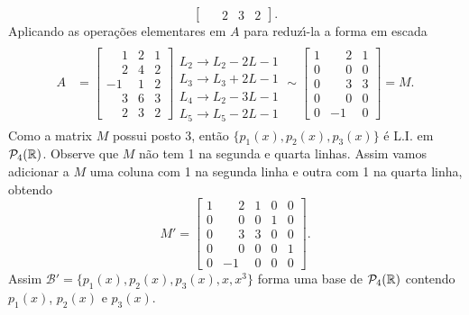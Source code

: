 \begin{exemplo}
\begin{enumerate}[label={\arabic*})]
\begin{solucao}
\[\begin{bmatrix}
					\phantom{-}2 & 3 & 2
				\end{bmatrix}.
			\]
			Aplicando as opera\c{c}\~oes elementares em $A$ para reduz{\'\i}-la a forma em escada
			\begin{align*}
				A &= 
					\left[
						\begin{array}{ccc}
		  					\phantom{-}1 & 2 & 1\\
							\phantom{-}2 & 4 & 2\\
							-1 & 1 & 2\\
							\phantom{-}3 & 6 & 3\\
							\phantom{-}2 & 3 & 2
     					\end{array}
     				\right]
     				\begin{array}{l}
     					\phantom{x}\\
     					L_2 \to L_2 - 2L-1\\
     					L_3 \to L_3 + 2L-1\\
     					L_4 \to L_2 - 3L-1\\
     					L_5 \to L_5 - 2L-1
     				\end{array} \sim
     				\left[
	     				\begin{array}{ccc}
		  					1 & \phantom{-}2 & 1\\
							0 & \phantom{-}0 & 0\\
							0 & \phantom{-}3 & 3\\
							0 & \phantom{-}0 & 0\\
							0 & -1 & 0
	     				\end{array}
     				\right] = M.
     		\end{align*}
     		Como a matrix $M$ possui posto 3, ent\~ao $\{p_1(x), p_2(x), p_3(x)\}$ \'e L.I. em $\mathcal{P}_4(\mathbb{R})$. Observe que $M$ n\~ao tem 1 na segunda e quarta linhas. Assim vamos adicionar a $M$ uma coluna com 1 na segunda linha e outra com 1 na quarta linha, obtendo
     		\[
     			M' = \begin{bmatrix}
  					1 & \phantom{-}2 & 1 & 0 & 0\\
					0 & \phantom{-}0 & 0 & 1 & 0\\
					0 & \phantom{-}3 & 3 & 0 & 0\\
					0 & \phantom{-}0 & 0 & 0 & 1\\
					0 & -1 & 0 & 0 & 0
     			\end{bmatrix}.
     		\]
     		Assim $\mathcal{B}' = \{p_1(x), p_2(x), p_3(x),x, x^3\}$ forma uma base de $\mathcal{P}_4(\mathbb{R})$ contendo $p_1(x)$, $p_2(x)$ e $p_3(x)$.
		\end{solucao}

\end{enumerate}
\end{exemplo}
